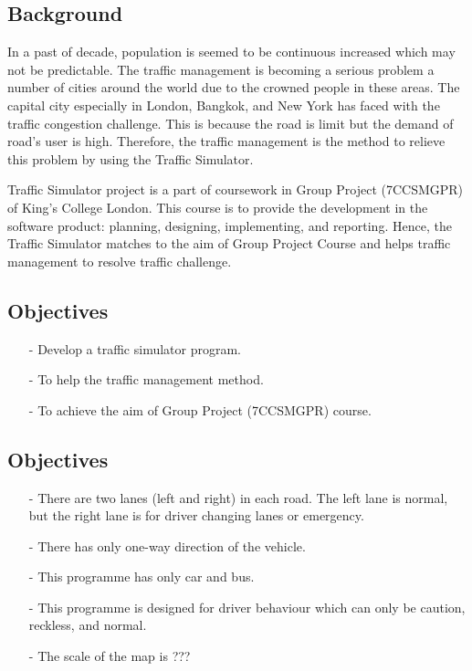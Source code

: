 \documentclass[11pt]{article}
\begin{document}
\subsection{Background}
In a past of decade, population is seemed to be continuous increased which may not be
predictable. The traffic management is becoming a serious problem a number of cities around the
world due to the crowned people in these areas. The capital city especially in London, Bangkok, and
New York has faced with the traffic congestion challenge. This is because the road is limit but the
demand of road’s user is high. Therefore, the traffic management is the method to relieve this
problem by using the Traffic Simulator.

Traffic Simulator project is a part of coursework in Group Project (7CCSMGPR) of King’s
College London. This course is to provide the development in the software product: planning,
designing, implementing, and reporting. Hence, the Traffic Simulator matches to the aim of Group
Project Course and helps traffic management to resolve traffic challenge.

\subsection{Objectives}
\begin{itemize}
\item[-] Develop a traffic simulator program.
\item[-] To help the traffic management method.
\item[-] To achieve the aim of Group Project (7CCSMGPR) course.
\end{itemize}

\subsection{Objectives}
\begin{itemize}
\item[-] There are two lanes (left and right) in each road. The left lane is normal, but the right lane
is for driver changing lanes or emergency.
\item[-] There has only one-way direction of the vehicle.
\item[-] This programme has only car and bus.
\item[-] This programme is designed for driver behaviour which can only be caution, reckless, and
normal.
\item[-] The scale of the map is ???
\end{itemize}
\end{document}
